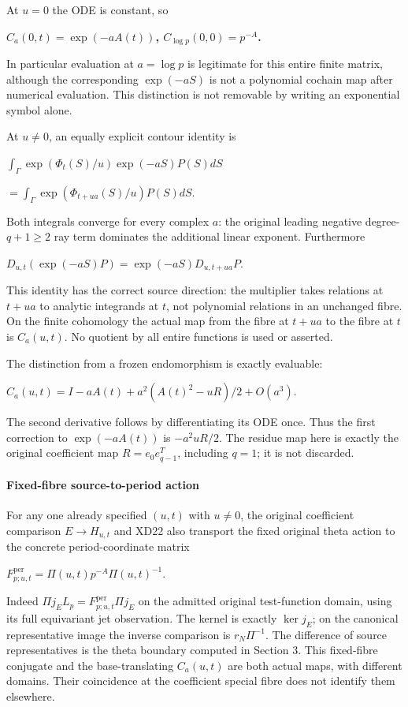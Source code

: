 \documentclass{article}
\begin{document}
At \(u=0\) the ODE is constant, so

\textbf{\(C_a(0,t)=\exp(-a A(t))\), \(C_{\log p}(0,0)=p^{-A}\).}

In particular evaluation at \(a=\log p\) is legitimate for this entire finite matrix, although the corresponding \(\exp(-aS)\) is not a polynomial cochain map after numerical evaluation. This distinction is not removable by writing an exponential symbol alone.

At \(u\ne 0\), an equally explicit contour identity is

\(\int_\Gamma \exp(\Phi_t(S)/u) \exp(-aS) P(S)dS\)

\(=\int_\Gamma \exp(\Phi_{t+ua}(S)/u) P(S)dS\).

Both integrals converge for every complex \(a\): the original leading negative degree-\(q+1\ge 2\) ray term dominates the additional linear exponent. Furthermore

\(D_{u,t}(\exp(-aS)P)=\exp(-aS)D_{u,t+ua}P\).

This identity has the correct source direction: the multiplier takes relations at \(t+ua\) to analytic integrands at \(t\), not polynomial relations in an unchanged fibre. On the finite cohomology the actual map from the fibre at \(t+ua\) to the fibre at \(t\) is \(C_a(u,t)\). No quotient by all entire functions is used or asserted.

The distinction from a frozen endomorphism is exactly evaluable:

\(C_a(u,t)=I-aA(t)+a^2(A(t)^2-uR)/2+O(a^3)\).

The second derivative follows by differentiating its ODE once. Thus the first correction to \(\exp(-aA(t))\) is \(-a^2uR/2\). The residue map here is exactly the original coefficient map \(R=e_0 e_{q-1}^T\), including \(q=1\); it is not discarded.

\paragraph{Fixed-fibre source-to-period action}\label{endpoint-f1_scaling--fixed-fibre-source-to-period-action}

For any one already specified \((u,t)\) with \(u\ne 0\), the original coefficient comparison \(E \to  H_{u,t}\) and XD22 also transport the fixed original theta action to the concrete period-coordinate matrix

\(F_{p;u,t}^{\mathrm{per}}=\Pi(u,t) p^{-A} \Pi(u,t)^{-1}\).

Indeed \(\Pi j_E L_p=F_{p;u,t}^{\mathrm{per}} \Pi j_E\) on the admitted original test-function domain, using its full equivariant jet observation. The kernel is exactly \(\ker j_E\); on the canonical representative image the inverse comparison is \(r_N \Pi^{-1}\). The difference of source representatives is the theta boundary computed in Section 3. This fixed-fibre conjugate and the base-translating \(C_a(u,t)\) are both actual maps, with different domains. Their coincidence at the coefficient special fibre does not identify them elsewhere.
\end{document}
